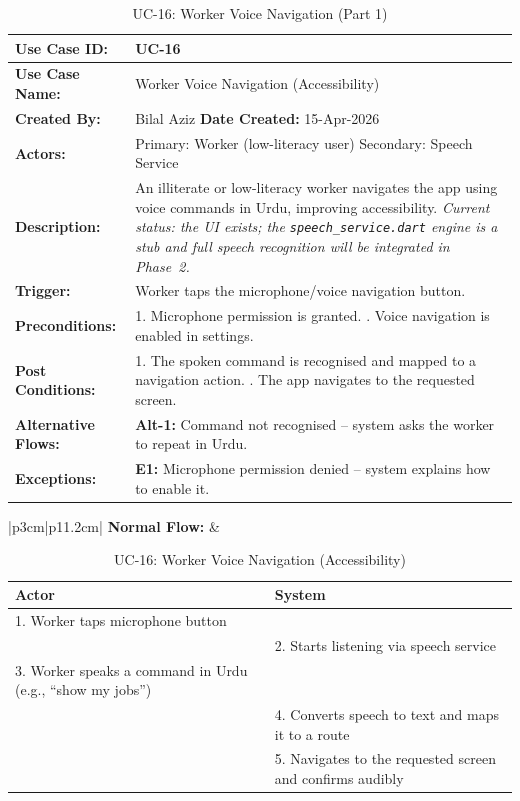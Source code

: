 {\small
\renewcommand{\arraystretch}{1.05}
\begin{table}[H]
\centering
\begin{tabular}{|p{3cm}|p{11.2cm}|}
\hline
\textbf{Use Case ID:} & UC-16 \\ \hline
\textbf{Use Case Name:} & Worker Voice Navigation (Accessibility) \\ \hline
\textbf{Created By:} & Bilal Aziz \hfill \textbf{Date Created:} 15-Apr-2026 \\ \hline
\textbf{Actors:} & Primary: Worker (low-literacy user) \quad Secondary: Speech Service \\ \hline
\textbf{Description:} & An illiterate or low-literacy worker navigates the app using voice commands in Urdu, improving accessibility. \textit{Current status: the UI exists; the \texttt{speech\_service.dart} engine is a stub and full speech recognition will be integrated in Phase~2.} \\ \hline
\textbf{Trigger:} & Worker taps the microphone/voice navigation button. \\ \hline
\textbf{Preconditions:} & 1. Microphone permission is granted. \newline 2. Voice navigation is enabled in settings. \\ \hline
\textbf{Post Conditions:} & 1. The spoken command is recognised and mapped to a navigation action. \newline 2. The app navigates to the requested screen. \\ \hline
\textbf{Alternative Flows:} & \textbf{Alt-1:} Command not recognised -- system asks the worker to repeat in Urdu. \\ \hline
\textbf{Exceptions:} & \textbf{E1:} Microphone permission denied -- system explains how to enable it. \\ \hline
\end{tabular}
\caption*{UC-16: Worker Voice Navigation (Part 1)}
\end{table}
}

\newpage

{\small
\renewcommand{\arraystretch}{1.05}
\begin{table}[H]
\centering
\begin{tabular}{|p{3cm}|p{11.2cm}|}
\hline
\textbf{Normal Flow:} &
\begin{tabular}[t]{|p{5.4cm}|p{5.4cm}|}
\hline
\textbf{Actor} & \textbf{System} \\ \hline
1. Worker taps microphone button & \\ \hline
 & 2. Starts listening via speech service \\ \hline
3. Worker speaks a command in Urdu (e.g., ``show my jobs'') & \\ \hline
 & 4. Converts speech to text and maps it to a route \\ \hline
 & 5. Navigates to the requested screen and confirms audibly \\ \hline
\end{tabular} \\ \hline
\end{tabular}
\caption{UC-16: Worker Voice Navigation (Accessibility)}
\end{table}
}

